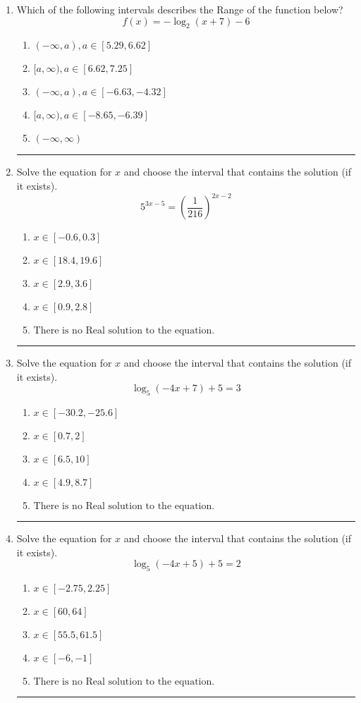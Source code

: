 \documentclass[14pt]{extbook}
\newcommand{\litem}[1]{\item#1\hspace*{-1cm}\rule{\textwidth}{0.4pt}}
\begin{document}
\begin{enumerate}
{\begin{enumerate}[label=\Alph*.]
\end{enumerate} }
\litem{
Which of the following intervals describes the Range of the function below?\[ f(x) = -\log_2{(x+7)}-6 \]\begin{enumerate}[label=\Alph*.]
\item \( (-\infty, a), a \in [5.29, 6.62] \)
\item \( [a, \infty), a \in [6.62, 7.25] \)
\item \( (-\infty, a), a \in [-6.63, -4.32] \)
\item \( [a, \infty), a \in [-8.65, -6.39] \)
\item \( (-\infty, \infty) \)

\end{enumerate} }
\litem{
Solve the equation for $x$ and choose the interval that contains the solution (if it exists).\[ 5^{3x-5} = \left(\frac{1}{216}\right)^{2x-2} \]\begin{enumerate}[label=\Alph*.]
\item \( x \in [-0.6, 0.3] \)
\item \( x \in [18.4, 19.6] \)
\item \( x \in [2.9, 3.6] \)
\item \( x \in [0.9, 2.8] \)
\item \( \text{There is no Real solution to the equation.} \)

\end{enumerate} }
\litem{
Solve the equation for $x$ and choose the interval that contains the solution (if it exists).\[ \log_{5}{(-4x+7)}+5 = 3 \]\begin{enumerate}[label=\Alph*.]
\item \( x \in [-30.2, -25.6] \)
\item \( x \in [0.7, 2] \)
\item \( x \in [6.5, 10] \)
\item \( x \in [4.9, 8.7] \)
\item \( \text{There is no Real solution to the equation.} \)

\end{enumerate} }
\litem{
Solve the equation for $x$ and choose the interval that contains the solution (if it exists).\[ \log_{5}{(-4x+5)}+5 = 2 \]\begin{enumerate}[label=\Alph*.]
\item \( x \in [-2.75, 2.25] \)
\item \( x \in [60, 64] \)
\item \( x \in [55.5, 61.5] \)
\item \( x \in [-6, -1] \)
\item \( \text{There is no Real solution to the equation.} \)


\end{enumerate}}
\end{enumerate}
\end{document}

